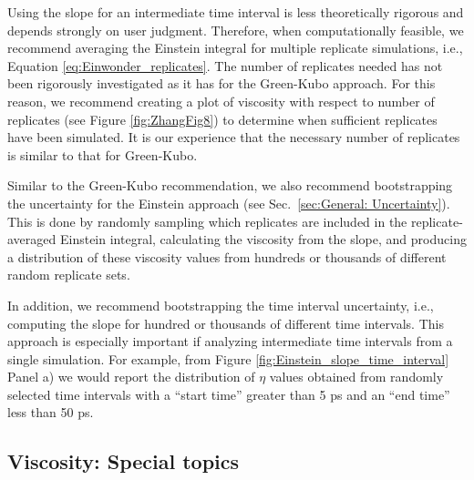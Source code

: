 \documentclass[9pt,bestpractices]{livecoms}
\begin{document}


Using the slope for an intermediate time interval is less theoretically rigorous and depends strongly on user judgment. Therefore, when computationally feasible, we recommend averaging the Einstein integral for multiple replicate simulations, i.e., Equation \ref{eq:Einwonder_replicates}. The number of replicates needed has not been rigorously investigated as it has for the Green-Kubo approach. For this reason, we recommend creating a plot of viscosity with respect to number of replicates (see Figure \ref{fig:ZhangFig8}) to determine when sufficient replicates have been simulated. It is our experience that the necessary number of replicates is similar to that for Green-Kubo. 

Similar to the Green-Kubo recommendation, we also recommend bootstrapping the uncertainty for the Einstein approach (see Sec.\ \ref{sec:General: Uncertainty}). This is done by randomly sampling which replicates are included in the replicate-averaged Einstein integral, calculating the viscosity from the slope, and producing a distribution of these viscosity values from hundreds or thousands of different random replicate sets. 

In addition, we recommend bootstrapping the time interval uncertainty, i.e., computing the slope for hundred or thousands of different time intervals. This approach is especially important if analyzing intermediate time intervals from a single simulation. For example, from Figure \ref{fig:Einstein_slope_time_interval} Panel a) we would report the distribution of $\eta$ values obtained from randomly selected time intervals with a ``start time'' greater than 5 ps and an ``end time'' less than 50 ps. 


\subsection{Viscosity: Special topics} \label{sec:Viscosity Special topics}
\end{document}
